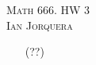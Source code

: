 \documentclass[12pt]{amsart}
\begin{document}
\begin{center}
    \textsc{Math 666. HW 3\\ Ian Jorquera}
\end{center}
\vspace{1em}

\begin{itemize}
    \item[(??)]

\end{itemize}
\end{document}
